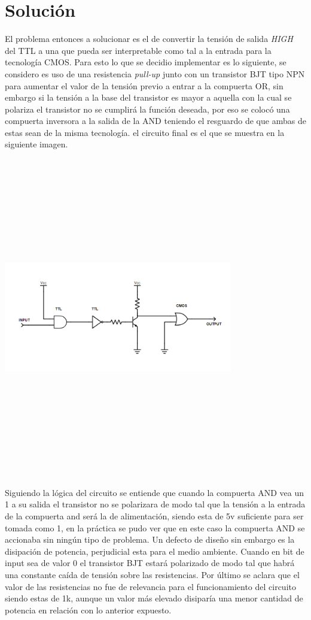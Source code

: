 \section{Solución}
El problema entonces a solucionar es el de convertir la tensión de salida \textit{HIGH} del TTL a una que pueda ser interpretable como tal a la entrada para la tecnología CMOS.
Para esto lo que se decidio implementar es lo siguiente, se considero es uso de una resistencia \textit{pull-up} junto con un transistor BJT tipo NPN para aumentar el valor de la tensión previo a entrar a la compuerta OR, sin embargo si la tensión a la base del transistor es mayor a aquella con la cual se polariza el transistor no se cumplirá la función deseada, por eso se colocó una compuerta inversora a la salida de la AND teniendo el resguardo de que ambas de estas sean de la misma tecnología. el circuito final es el que se muestra en la siguiente imagen.
\begin{center}
\includegraphics[max height=14cm,max width=10cm,keepaspectratio]{../5-TTL&CMOS/E3-ej5-corregido.png}
\end{center}

Siguiendo la lógica del circuito se entiende que cuando la compuerta AND vea un 1 a su salida el transistor no se polarizara de modo tal que la tensión a la entrada de la compuerta and será la de alimentación, siendo esta de 5v suficiente para ser tomada como 1, en la práctica se pudo ver que en este caso la compuerta AND se accionaba sin ningún tipo de problema.
Un defecto de diseño sin embargo es la disipación de potencia, perjudicial esta para el medio ambiente. Cuando en bit de input sea de valor 0 el transistor BJT estará polarizado de modo tal que habrá una constante caída de tensión sobre las resistencias.
Por último se aclara que el valor de las resistencias no fue de relevancia para el funcionamiento del circuito siendo estas de 1k, aunque un valor más elevado disiparía una menor cantidad de potencia en relación con lo anterior expuesto.
